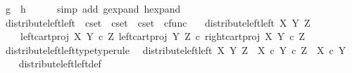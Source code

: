 \begin{isabellebody}
\ {\isachardoublequoteopen}g\ {\isacharequal}{\kern0pt}\ h{\isachardoublequoteclose}\isanewline
\ \ \ \ \isamarkupfalse%
\ {\isacharparenleft}{\kern0pt}simp\ add{\isacharcolon}{\kern0pt}\ g{\isacharunderscore}{\kern0pt}expand\ h{\isacharunderscore}{\kern0pt}expand{\isacharparenright}{\kern0pt}\isanewline
{}\isamarkupfalse%
%
\endisatagproof
{\isafoldproof}%
%
\isadelimproof
%
\endisadelimproof
%
\isadelimdocument
%
\endisadelimdocument
%
\isatagdocument
%
\isamarkuptrue%
%
\endisatagdocument
{\isafolddocument}%
%
\isadelimdocument
%
\endisadelimdocument
{}\isamarkupfalse%
\ distribute{\isacharunderscore}{\kern0pt}left{\isacharunderscore}{\kern0pt}left\ {\isacharcolon}{\kern0pt}{\isacharcolon}{\kern0pt}\ {\isachardoublequoteopen}cset\ {\isasymRightarrow}\ cset\ {\isasymRightarrow}\ cset\ {\isasymRightarrow}\ cfunc{\isachardoublequoteclose}\ \isanewline
\ \ {\isachardoublequoteopen}distribute{\isacharunderscore}{\kern0pt}left{\isacharunderscore}{\kern0pt}left\ X\ Y\ Z\ {\isacharequal}{\kern0pt}\ \isanewline
\ \ \ \ {\isasymlangle}left{\isacharunderscore}{\kern0pt}cart{\isacharunderscore}{\kern0pt}proj\ X\ {\isacharparenleft}{\kern0pt}Y\ {\isasymtimes}\isactrlsub c\ Z{\isacharparenright}{\kern0pt}{\isacharcomma}{\kern0pt}\ left{\isacharunderscore}{\kern0pt}cart{\isacharunderscore}{\kern0pt}proj\ Y\ Z\ {\isasymcirc}\isactrlsub c\ right{\isacharunderscore}{\kern0pt}cart{\isacharunderscore}{\kern0pt}proj\ X\ {\isacharparenleft}{\kern0pt}Y\ {\isasymtimes}\isactrlsub c\ Z{\isacharparenright}{\kern0pt}{\isasymrangle}{\isachardoublequoteclose}\isanewline
\isanewline
{}\isamarkupfalse%
\ distribute{\isacharunderscore}{\kern0pt}left{\isacharunderscore}{\kern0pt}left{\isacharunderscore}{\kern0pt}type{\isacharbrackleft}{\kern0pt}type{\isacharunderscore}{\kern0pt}rule{\isacharbrackright}{\kern0pt}{\isacharcolon}{\kern0pt}\isanewline
\ \ {\isachardoublequoteopen}distribute{\isacharunderscore}{\kern0pt}left{\isacharunderscore}{\kern0pt}left\ X\ Y\ Z\ {\isacharcolon}{\kern0pt}\ X\ {\isasymtimes}\isactrlsub c\ {\isacharparenleft}{\kern0pt}Y\ {\isasymtimes}\isactrlsub c\ Z{\isacharparenright}{\kern0pt}\ {\isasymrightarrow}\ X\ {\isasymtimes}\isactrlsub c\ Y{\isachardoublequoteclose}\isanewline
%
\isadelimproof
\ \ %
\endisadelimproof
%
\isatagproof
{}\isamarkupfalse%
\ distribute{\isacharunderscore}{\kern0pt}left{\isacharunderscore}{\kern0pt}left{\isacharunderscore}{\kern0pt}def\isanewline
\ \ \isamarkupfalse%

\end{isabellebody}
